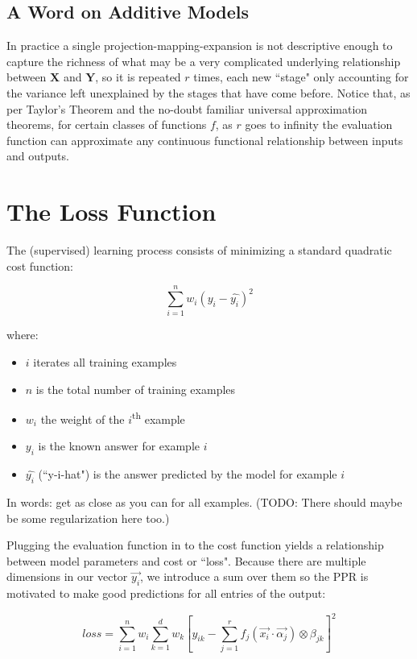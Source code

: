 \documentclass[12pt]{article}
\begin{document}
\subsection{A Word on Additive Models}

In practice a single projection-mapping-expansion is not descriptive enough to capture the richness of what may be a very complicated underlying relationship between $\pmb{X}$ and $\pmb{Y}$, so it is repeated $r$ times, each new ``stage" only accounting for the variance left unexplained by the stages that have come before. Notice that, as per Taylor's Theorem and the no-doubt familiar universal approximation theorems, for certain classes of functions $f$, as $r$ goes to infinity the evaluation function can approximate any continuous functional relationship between inputs and outputs.

\section{The Loss Function}

The (supervised) learning process consists of minimizing a standard quadratic cost function:

$$\sum_{i=1}^n w_i (y_i - \hat{y_i})^2$$

where:
\begin{itemize}
	\setlength\itemsep{-2mm}
	\item $i$ iterates all training examples
	\item $n$ is the total number of training examples
	\item $w_i$ the weight of the $i$\textsuperscript{th} example
	\item $y_i$ is the known answer for example $i$
	\item $\hat{y_i}$ (``y-i-hat") is the answer predicted by the model for example $i$
\end{itemize}

In words: get as close as you can for all examples. (TODO: There should maybe be some regularization here too.)

Plugging the evaluation function in to the cost function yields a relationship between model parameters and cost or ``loss". Because there are multiple dimensions in our vector $\vec{y_i}$, we introduce a sum over them so the PPR is motivated to make good predictions for all entries of the output:

$$loss = \sum_{i=1}^n w_i \sum_{k=1}^d w_k [y_{ik} - \sum_{j=1}^r f_j(\vec{x_i} \cdot \vec{\alpha_j}) \otimes \beta_{jk}]^2$$
\end{document}
